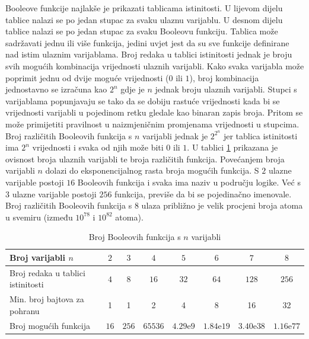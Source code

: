 \documentclass[times, utf8, diplomski]{fer}
\begin{document}
Booleove funkcije najlakše je prikazati tablicama istinitosti. U lijevom dijelu tablice nalazi se po jedan stupac za svaku ulaznu varijablu. U desnom dijelu tablice nalazi se po jedan stupac za svaku Booleovu funkciju. Tablica može sadržavati jednu ili više funkcija, jedini uvjet jest da su sve funkcije definirane nad istim ulaznim varijablama. Broj redaka u tablici istinitosti jednak je broju svih mogućih kombinacija vrijednosti ulaznih varijabli. Kako svaka varijabla može poprimit jednu od dvije moguće vrijednosti ($0$ ili $1$), broj kombinacija jednostavno se izračuna kao $2^{n}$ gdje je $n$ jednak broju ulaznih varijabli. Stupci s varijablama popunjavaju se tako da se dobiju rastuće vrijednosti kada bi se vrijednosti varijabli u pojedinom retku gledale kao binaran zapis broja. Pritom se može primijetiti pravilnost u naizmjeničnim promjenama vrijednosti u stupcima. Broj različitih Booleovih funkcija s $n$ varijabli jednak je $2^{2^{n}}$ jer tablica istinitosti ima $2^{n}$ vrijednosti i svaka od njih može biti $0$ ili $1$. U tablici \ref{tab:brojFunkcija} prikazana je ovisnost broja ulaznih varijabli te broja različitih funkcija. Povećanjem broja varijabli $n$ dolazi do eksponencijalnog rasta broja mogućih funkcija. S $2$ ulazne varijable postoji $16$ Booleovih funkcija i svaka ima naziv u području logike. Već s $3$ ulazne varijable postoji $256$ funkcija, previše da bi se pojedinačno imenovale. Broj različitih Booleovih funkcija s $8$ ulaza približno je velik procjeni broja atoma u svemiru (između $10^{78}$ i $10^{82}$ atoma).

\begin{table}[htb]
	\centering
	\caption{Broj Booleovih funkcija s $n$ varijabli}
	\label{tab:brojFunkcija}
	\begin{tabular}{|l|c|c|c|c|c|c|c|}
		\hline
		Broj varijabli $n$ & $2$ & $3$ & $4$ & $5$ & $6$ & $7$ & $8$ \\
		\hline
		Broj redaka u tablici istinitosti & $4$ & $8$ & $16$ & $32$ & $64$ & $128$ & $256$ \\
		\hline
		Min. broj bajtova za pohranu & 1 & 1 & 2 & 4 & 8 & 16 & 32 \\
		\hline
		Broj mogućih funkcija & $16$ & $256$ & $65536$ & $4.29\mathrm{e}{9}$ & $1.84\mathrm{e}{19}$ & $3.40\mathrm{e}{38}$ & $1.16\mathrm{e}{77}$ \\
		\hline
	\end{tabular}
\end{table}
\end{document}
